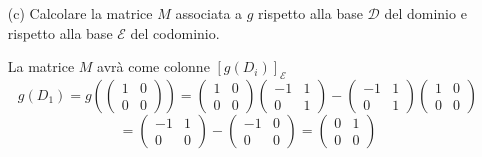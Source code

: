 \documentclass[a4paper]{article}
\theoremstyle{break}
\theoremstyle{break}
\theoremstyle{break}
\theoremstyle{break}
\begin{document}
\begin{enumerate}
	\item[(c)] Calcolare la matrice \( M \) associata a \( g \) rispetto alla base \( \mathcal{D} \)
	      del dominio e rispetto alla base \( \mathcal{E} \) del codominio.

        \vspace{1em}
        La matrice \( M \) avrà come colonne \( [g(D_i)]_{\mathcal{E}} \) 
        \[
        g(D_1) = g \left( \begin{pmatrix} 1 & 0\\0 & 0 \end{pmatrix} \right) =
        \begin{pmatrix} 
          1 & 0\\
          0 & 0
        \end{pmatrix} 
        \begin{pmatrix} 
          -1 & 1\\
          0 & 1
        \end{pmatrix} 
        -
        \begin{pmatrix} 
          -1 & 1\\
          0 & 1
        \end{pmatrix} 
        \begin{pmatrix} 
          1 & 0\\
          0 & 0
        \end{pmatrix} 
        \] 
        \[
        = \begin{pmatrix} 
          -1 & 1\\
          0 & 0
        \end{pmatrix} 
        -
        \begin{pmatrix} 
          -1 & 0\\
          0 & 0
        \end{pmatrix} 
        =
        \begin{pmatrix} 
          0 & 1\\
          0 & 0
        \end{pmatrix} 
        \] 


\end{enumerate}
\end{document}
